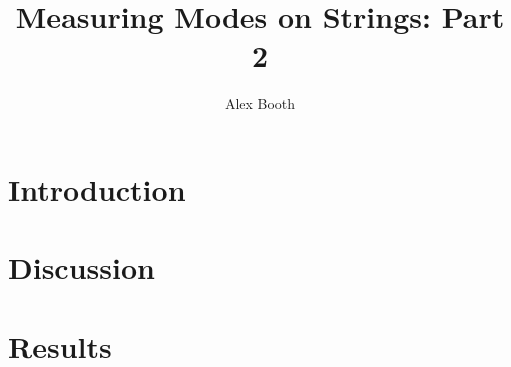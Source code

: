 \documentclass{article}
\title{Measuring Modes on Strings: Part 2}
\author{Alex Booth}
\begin{document}
    \maketitle

    \section{Introduction}
    
    \section{Discussion}

    \section{Results}
\end{document}
